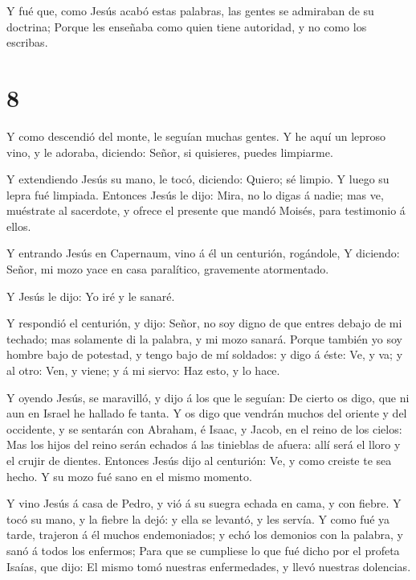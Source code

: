  Y fué que, como Jesús acabó estas palabras, las gentes se
admiraban de su doctrina;  Porque les enseñaba como quien
tiene autoridad, y no como los escribas.

\hypertarget{section-7}{%
\section{8}\label{section-7}}

 Y como descendió del monte, le seguían muchas gentes.
 Y he aquí un leproso vino, y le adoraba, diciendo: Señor,
si quisieres, puedes limpiarme.

 Y extendiendo Jesús su mano, le tocó, diciendo: Quiero; sé
limpio. Y luego su lepra fué limpiada.  Entonces Jesús le
dijo: Mira, no lo digas á nadie; mas ve, muéstrate al sacerdote, y
ofrece el presente que mandó Moisés, para testimonio á ellos.

 Y entrando Jesús en Capernaum, vino á él un centurión,
rogándole,  Y diciendo: Señor, mi mozo yace en casa
paralítico, gravemente atormentado.

 Y Jesús le dijo: Yo iré y le sanaré.

 Y respondió el centurión, y dijo: Señor, no soy digno de
que entres debajo de mi techado; mas solamente di la palabra, y mi mozo
sanará.  Porque también yo soy hombre bajo de potestad, y
tengo bajo de mí soldados: y digo á éste: Ve, y va; y al otro: Ven, y
viene; y á mi siervo: Haz esto, y lo hace.

 Y oyendo Jesús, se maravilló, y dijo á los que le seguían:
De cierto os digo, que ni aun en Israel he hallado fe tanta.
 Y os digo que vendrán muchos del oriente y del occidente,
y se sentarán con Abraham, é Isaac, y Jacob, en el reino de los cielos:
 Mas los hijos del reino serán echados á las tinieblas de
afuera: allí será el lloro y el crujir de dientes. 
Entonces Jesús dijo al centurión: Ve, y como creiste te sea hecho. Y su
mozo fué sano en el mismo momento.

 Y vino Jesús á casa de Pedro, y vió á su suegra echada en
cama, y con fiebre.  Y tocó su mano, y la fiebre la dejó: y
ella se levantó, y les servía.  Y como fué ya tarde,
trajeron á él muchos endemoniados; y echó los demonios con la palabra, y
sanó á todos los enfermos;  Para que se cumpliese lo que
fué dicho por el profeta Isaías, que dijo: El mismo tomó nuestras
enfermedades, y llevó nuestras dolencias.

